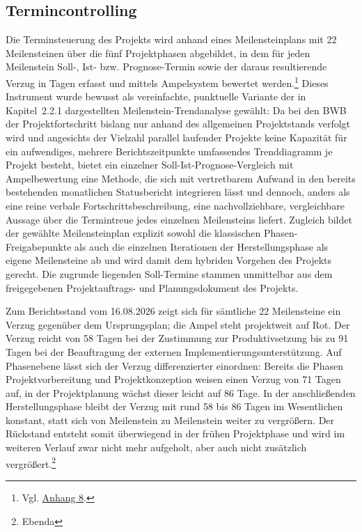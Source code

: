 \documentclass[
    12pt, 
    a4paper,
    ]{scrartcl} %
\begin{document}
\subsection{Termincontrolling}
Die Terminsteuerung des Projekts wird anhand eines Meilensteinplans mit 22 Meilensteinen über die fünf Projektphasen abgebildet, in dem für jeden Meilenstein Soll-, Ist- bzw. Prognose-Termin sowie der daraus resultierende Verzug in Tagen erfasst und mittels Ampelsystem bewertet werden.\footnote{Vgl. \hyperref[sec:Anhang8]{Anhang 8}.} Dieses Instrument wurde bewusst als vereinfachte, punktuelle Variante der in Kapitel~2.2.1 dargestellten Meilenstein-Trendanalyse gewählt: Da bei den BWB der Projektfortschritt bislang nur anhand des allgemeinen Projektstands verfolgt wird und angesichts der Vielzahl parallel laufender Projekte keine Kapazität für ein aufwendiges, mehrere Berichtszeitpunkte umfassendes Trenddiagramm je Projekt besteht, bietet ein einzelner Soll-Ist-Prognose-Vergleich mit Ampelbewertung eine Methode, die sich mit vertretbarem Aufwand in den bereits bestehenden monatlichen Statusbericht integrieren lässt und dennoch, anders als eine reine verbale Fortschrittsbeschreibung, eine nachvollziehbare, vergleichbare Aussage über die Termintreue jedes einzelnen Meilensteins liefert. Zugleich bildet der gewählte Meilensteinplan explizit sowohl die klassischen Phasen-Freigabepunkte als auch die einzelnen Iterationen der Herstellungsphase als eigene Meilensteine ab und wird damit dem hybriden Vorgehen des Projekts gerecht. Die zugrunde liegenden Soll-Termine stammen unmittelbar aus dem freigegebenen Projektauftrags- und Planungsdokument des Projekts.

Zum Berichtsstand vom 16.08.2026 zeigt sich für sämtliche 22 Meilensteine ein Verzug gegenüber dem Ursprungsplan; die Ampel steht projektweit auf Rot. Der Verzug reicht von 58 Tagen bei der Zustimmung zur Produktivsetzung bis zu 91 Tagen bei der Beauftragung der externen Implementierungsunterstützung. Auf Phasenebene lässt sich der Verzug differenzierter einordnen: Bereits die Phasen Projektvorbereitung und Projektkonzeption weisen einen Verzug von 71 Tagen auf, in der Projektplanung wächst dieser leicht auf 86 Tage. In der anschließenden Herstellungsphase bleibt der Verzug mit rund 58 bis 86 Tagen im Wesentlichen konstant, statt sich von Meilenstein zu Meilenstein weiter zu vergrößern. Der Rückstand entsteht somit überwiegend in der frühen Projektphase und wird im weiteren Verlauf zwar nicht mehr aufgeholt, aber auch nicht zusätzlich vergrößert.\footnote{Ebenda} 
\end{document}
